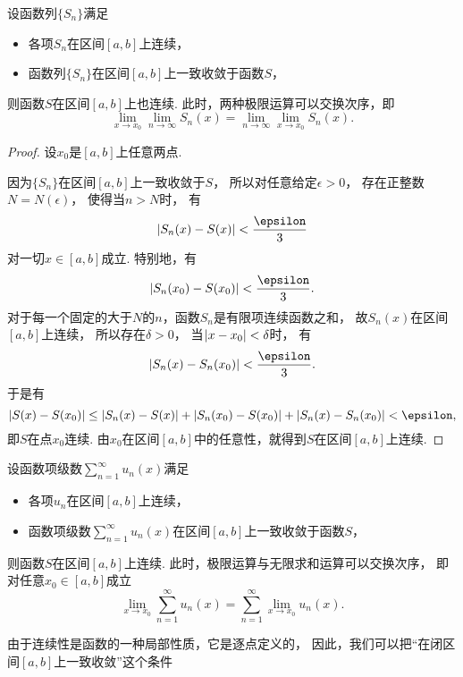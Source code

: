 \begin{theorem}\label{theorem:函数项级数.连续函数列的一致收敛性保证极限函数的连续性}
设函数列\(\{S_n\}\)满足\begin{itemize}
	\item 各项\(S_n\)在区间\([a,b]\)上连续，
	\item 函数列\(\{S_n\}\)在区间\([a,b]\)上一致收敛于函数\(S\)，
\end{itemize}
则函数\(S\)在区间\([a,b]\)上也连续.
此时，两种极限运算可以交换次序，即\[
	\lim_{x \to x_0} \lim_{n\to\infty} S_n(x)
	= \lim_{n\to\infty} \lim_{x \to x_0} S_n(x).
\]
\begin{proof}
设\(x_0\)是\([a,b]\)上任意两点.

因为\(\{S_n\}\)在区间\([a,b]\)上一致收敛于\(S\)，
所以对任意给定\(\epsilon>0\)，
存在正整数\(N = N(\epsilon)\)，
使得当\(n>N\)时，
有\[
	\abs{S_n(x) - S(x)} < \frac\epsilon3
\]对一切\(x\in[a,b]\)成立.
特别地，有\[
	\abs{S_n(x_0) - S(x_0)} < \frac\epsilon3.
\]
对于每一个固定的大于\(N\)的\(n\)，函数\(S_n\)是有限项连续函数之和，
故\(S_n(x)\)在区间\([a,b]\)上连续，
所以存在\(\delta>0\)，
当\(\abs{x - x_0} < \delta\)时，
有\[
	\abs{S_n(x) - S_n(x_0)} < \frac\epsilon3.
\]
于是有\[
	\abs{S(x) - S(x_0)}
	\leq \abs{S_n(x) - S(x)}
		+ \abs{S_n(x_0) - S(x_0)}
		+ \abs{S_n(x) - S_n(x_0)}
	< \epsilon,
\]
即\(S\)在点\(x_0\)连续.
由\(x_0\)在区间\([a,b]\)中的任意性，就得到\(S\)在区间\([a,b]\)上连续.
\end{proof}
\end{theorem}
\begin{theorem}\label{theorem:函数项级数.连续函数项级数的一致收敛性保证和函数的连续性}
设函数项级数\(\sum_{n=1}^\infty u_n(x)\)满足\begin{itemize}
	\item 各项\(u_n\)在区间\([a,b]\)上连续，
	\item 函数项级数\(\sum_{n=1}^\infty u_n(x)\)在区间\([a,b]\)上一致收敛于函数\(S\)，
\end{itemize}
则函数\(S\)在区间\([a,b]\)上连续.
此时，极限运算与无限求和运算可以交换次序，
即对任意\(x_0\in[a,b]\)成立\[
	\lim_{x \to x_0} \sum_{n=1}^\infty u_n(x)
	= \sum_{n=1}^\infty \lim_{x \to x_0} u_n(x).
\]
\end{theorem}
由于连续性是函数的一种局部性质，它是逐点定义的，
因此，我们可以把“在闭区间\([a,b]\)上一致收敛”这个条件
